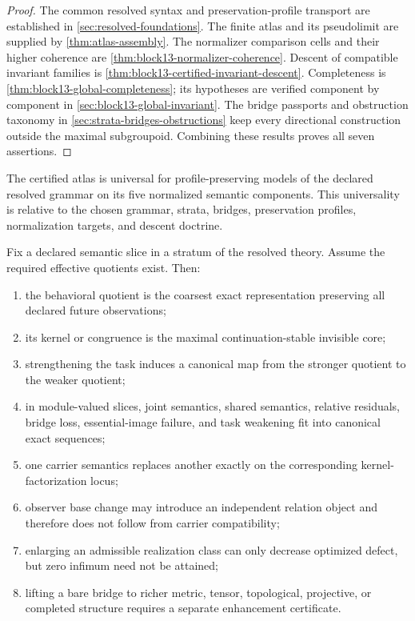 \begin{proof}
The common resolved syntax and preservation-profile transport are established in \cref{sec:resolved-foundations}.  The finite atlas and its pseudolimit are supplied by \cref{thm:atlas-assembly}.  The normalizer comparison cells and their higher coherence are \cref{thm:block13-normalizer-coherence}.  Descent of compatible invariant families is \cref{thm:block13-certified-invariant-descent}.  Completeness is \cref{thm:block13-global-completeness}; its hypotheses are verified component by component in \cref{sec:block13-global-invariant}.  The bridge passports and obstruction taxonomy in \cref{sec:strata-bridges-obstructions} keep every directional construction outside the maximal subgroupoid.  Combining these results proves all seven assertions.
\end{proof}

\begin{corollary}
\label{cor:block14-relative-universality}
The certified atlas is universal for profile-preserving models of the declared resolved grammar on its five normalized semantic components.  This universality is relative to the chosen grammar, strata, bridges, preservation profiles, normalization targets, and descent doctrine.
\end{corollary}

\begin{theorem}
\label{thm:block17-main-semantic}
Fix a declared semantic slice in a stratum of the resolved theory.  Assume the required effective quotients exist.  Then:
\begin{enumerate}
\item the behavioral quotient is the coarsest exact representation preserving all declared future observations;
\item its kernel or congruence is the maximal continuation-stable invisible core;
\item strengthening the task induces a canonical map from the stronger quotient to the weaker quotient;
\item in module-valued slices, joint semantics, shared semantics, relative residuals, bridge loss, essential-image failure, and task weakening fit into canonical exact sequences;
\item one carrier semantics replaces another exactly on the corresponding kernel-factorization locus;
\item observer base change may introduce an independent relation object and therefore does not follow from carrier compatibility;
\item enlarging an admissible realization class can only decrease optimized defect, but zero infimum need not be attained;
\item lifting a bare bridge to richer metric, tensor, topological, projective, or completed structure requires a separate enhancement certificate.
\end{enumerate}
\end{theorem}

